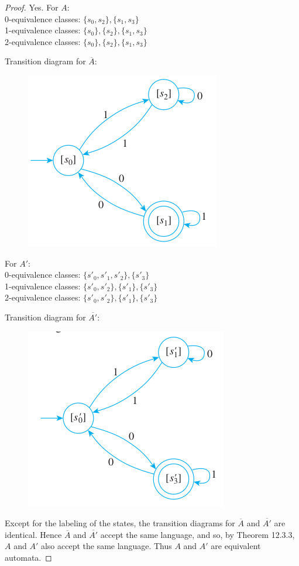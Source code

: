 \documentclass[14pt]{extarticle}
\begin{document}
\begin{proof}
Yes. For \(A\): \\
0-equivalence classes: \(\{s_0, s_2\}, \{s_1, s_3\}\) \\
1-equivalence classes: \(\{s_0\}, \{s_2\}, \{s_1, s_3\}\) \\
2-equivalence classes: \(\{s_0\}, \{s_2\}, \{s_1, s_3\}\)

Transition diagram for \(\overline{A}\):

\begin{figure}[ht!]
\centering
\includegraphics[scale=0.4]{../images/12.3.7.a.png}
\end{figure}

For \(A'\): \\
0-equivalence classes: \(\{s'_0, s'_1, s'_2\}, \{s'_3\}\) \\
1-equivalence classes: \(\{s'_0, s'_2\}, \{s'_1\}, \{s'_3\}\) \\
2-equivalence classes: \(\{s'_0, s'_2\}, \{s'_1\}, \{s'_3\}\)

Transition diagram for \(\overline{A'}\):

\begin{figure}[ht!]
\centering
\includegraphics[scale=0.5]{../images/12.3.7.b.png}
\end{figure}

Except for the labeling of the states, the transition diagrams for \(\overline{A}\) and \(\overline{A'}\) are identical. 
Hence \(\overline{A}\) and \(\overline{A'}\) accept the same language, and so, by Theorem 12.3.3, \(A\) and \(A'\) also 
accept the same language. Thus \(A\) and \(A'\) are equivalent automata.
\end{proof}
\end{document}
